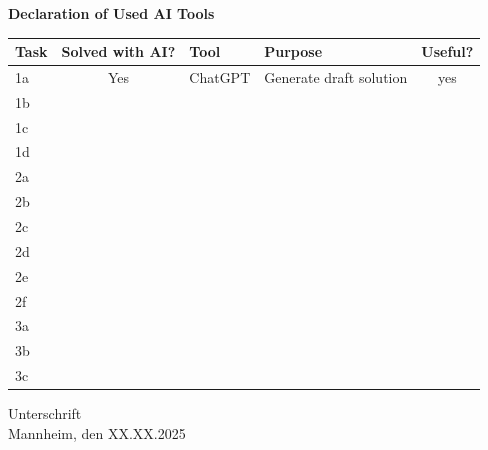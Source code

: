 \documentclass[a4paper,oneside,bibliography=totoc]{scrartcl}
\begin{document}
%
%
\begin{center}
  \textbf{Declaration of Used AI Tools} \\[.3em]
  \begin{tabularx}{\textwidth}{lclXc}
    \toprule
    Task & Solved with AI? & Tool & Purpose & Useful? \\
    \midrule
    1a & Yes & ChatGPT & Generate draft solution & yes \\
    1b \\
    1c \\
    1d \\
    2a \\
    2b \\
    2c \\
    2d \\
    2e \\
    2f \\
    3a \\
    3b \\
    3c \\
    \bottomrule
  \end{tabularx}
\end{center}

\vspace{2cm}
\noindent Unterschrift\\
\noindent Mannheim, den XX.XX.2025 \hfill
\end{document}
